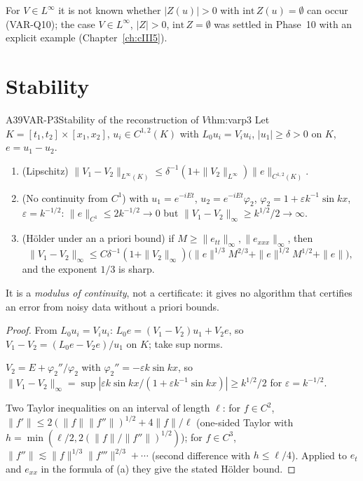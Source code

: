 \begin{caution}[title=Open]
For $V\in L^\infty$ it is not known whether $|Z(u)|>0$ with $\mathrm{int}\,Z(u)=\emptyset$ can occur (VAR-Q10); the case $V\in L^\infty$, $|Z|>0$, $\mathrm{int}\,Z=\emptyset$ was settled in Phase~10 with an explicit example (Chapter~\ref{ch:cIII5}).
\end{caution}

\section{Stability}

\begin{dimcard}{A39}{VAR-P3}{Stability of the reconstruction of $V$}{\proved}{thm:varp3}
Let $K=[t_1,t_2]\times[x_1,x_2]$, $u_i\in C^{1,2}(K)$ with $L_0u_i=V_iu_i$, $|u_1|\ge\delta>0$ on $K$, $e=u_1-u_2$.
\begin{enumerate}[label=(\alph*)]
\item (Lipschitz) $\|V_1-V_2\|_{L^\infty(K)}\le\delta^{-1}(1+\|V_2\|_{L^\infty})\|e\|_{C^{1,2}(K)}$.
\item (No continuity from $C^1$) with $u_1=e^{-iEt}$, $u_2=e^{-iEt}\varphi_2$, $\varphi_2=1+\varepsilon k^{-1}\sin kx$, $\varepsilon=k^{-1/2}$: $\|e\|_{C^1}\le2k^{-1/2}\to0$ but $\|V_1-V_2\|_\infty\ge k^{1/2}/2\to\infty$.
\item (H\"older under an a priori bound) if $M\ge\|e_{tt}\|_\infty,\|e_{xxx}\|_\infty$, then
\[
\|V_1-V_2\|_\infty\le C\delta^{-1}(1+\|V_2\|_\infty)\big(\|e\|^{1/3}M^{2/3}+\|e\|^{1/2}M^{1/2}+\|e\|\big),
\]
and the exponent $1/3$ is sharp.
\end{enumerate}
It is a \emph{modulus of continuity}, not a certificate: it gives no algorithm that certifies an error from noisy data without a priori bounds.
\end{dimcard}

\begin{proof}
From $L_0u_i=V_iu_i$: $L_0e=(V_1-V_2)u_1+V_2e$, so $V_1-V_2=(L_0e-V_2e)/u_1$ on $K$; take sup norms.

$V_2=E+\varphi_2''/\varphi_2$ with $\varphi_2''=-\varepsilon k\sin kx$, so $\|V_1-V_2\|_\infty=\sup|\varepsilon k\sin kx/(1+\varepsilon k^{-1}\sin kx)|\ge k^{1/2}/2$ for $\varepsilon=k^{-1/2}$.

Two Taylor inequalities on an interval of length $\ell$: for $f\in C^2$, $\|f'\|\le2(\|f\|\|f''\|)^{1/2}+4\|f\|/\ell$ (one-sided Taylor with $h=\min(\ell/2,2(\|f\|/\|f''\|)^{1/2})$); for $f\in C^3$, $\|f''\|\lesssim\|f\|^{1/3}\|f'''\|^{2/3}+\cdots$ (second difference with $h\le\ell/4$). Applied to $e_t$ and $e_{xx}$ in the formula of (a) they give the stated H\"older bound.

\end{proof}

